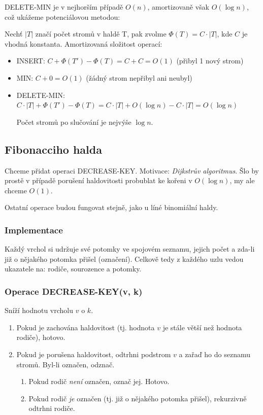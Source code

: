 \documentclass[11pt]{report} %
\numberwithin{equation}{section}
\begin{document}
\begin{enumerate}
	DELETE-MIN je v nejhorším případě $O(n)$, amortizovaně však $O(\log n)$, což ukážeme potenciálovou metodou:
	
	Nechť $|T|$ značí počet stromů v haldě T, pak zvolme $\Phi(T) = C\cdot|T|$, kde $C$ je vhodná konstanta. Amortizovaná složitost operací:
	\begin{itemize}
		
		
		\item INSERT: $C + \Phi(T') - \Phi(T) = C + C = O(1)$ (přibyl 1 nový strom)
		\item MIN: $C + 0 = O(1)$ (žádný strom nepřibyl ani neubyl)
		\item DELETE-MIN: $C\cdot|T| + \Phi(T') - \Phi(T) = C\cdot|T| + O(\log n) - C\cdot|T| = O(\log n)$
		
		Počet stromů po slučování je nejvýše $\log n$.
	\end{itemize}
\end{enumerate}

\subsection{Fibonacciho halda}
Chceme přidat operaci DECREASE-KEY. Motivace: \textit{Dijkstrův algoritmus}. Šlo by prostě v případě porušení haldovitosti probublat ke kořeni v $O(\log n)$, my ale chceme $O(1)$.

Ostatní operace budou fungovat stejně, jako u líné binomiální haldy.

\subsubsection{Implementace}
Každý vrchol si udržuje své potomky ve spojovém seznamu, jejich počet a zda-li již o nějakého potomka přišel (označení). Celkově tedy z každého uzlu vedou ukazatele na: rodiče, sourozence a potomky.

\subsubsection{Operace DECREASE-KEY(v, k)}
Sníží hodnotu vrcholu $v$ o $k$. 
\begin{enumerate}
	
	
	\item Pokud je zachována haldovitost (tj. hodnota $v$ je stále větší než hodnota rodiče), hotovo. 
	\item Pokud je porušena haldovitost, odtrhni podstrom $v$ a zařaď ho do seznamu stromů. Byl-li označen, odznač.
	\begin{enumerate}
		
		
		\item Pokud rodič \textit{není} označen, označ jej. Hotovo.
		\item Pokud rodič \textit{je} označen (tj. již o nějakého potomka přišel), rekurzivně odtrhni rodiče.
	\end{enumerate}
\end{enumerate}
\end{document}
